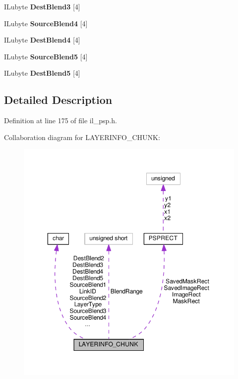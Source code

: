 \begin{DoxyCompactItemize}
I\+Lubyte {\bfseries Dest\+Blend3} \mbox{[}4\mbox{]}
\item 
\mbox{\label{structLAYERINFO__CHUNK_aa3c4e7dab493dec790df39c6fcfb69b0}} 
I\+Lubyte {\bfseries Source\+Blend4} \mbox{[}4\mbox{]}
\item 
\mbox{\label{structLAYERINFO__CHUNK_a3adc3bfc12624444833cf199220e5183}} 
I\+Lubyte {\bfseries Dest\+Blend4} \mbox{[}4\mbox{]}
\item 
\mbox{\label{structLAYERINFO__CHUNK_afb04bc5b85fcef6d2e3648766310002e}} 
I\+Lubyte {\bfseries Source\+Blend5} \mbox{[}4\mbox{]}
\item 
\mbox{\label{structLAYERINFO__CHUNK_a4372cdc5d81c737e49232201f0f416bf}} 
I\+Lubyte {\bfseries Dest\+Blend5} \mbox{[}4\mbox{]}
\end{DoxyCompactItemize}


\subsection{Detailed Description}


Definition at line 175 of file il\+\_\+psp.\+h.



Collaboration diagram for L\+A\+Y\+E\+R\+I\+N\+F\+O\+\_\+\+C\+H\+U\+NK\+:
\nopagebreak
\begin{figure}[H]
\begin{center}
\leavevmode
\includegraphics[width=350pt]{dd/d42/structLAYERINFO__CHUNK__coll__graph}
\end{center}
\end{figure}


